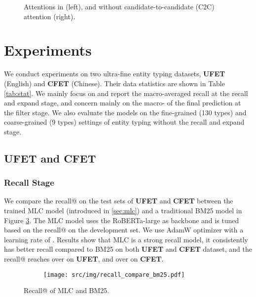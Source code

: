 \documentclass[11pt]{article}
\begin{document}
\begin{figure}[h]
    \centering
    \caption{Attentions in {\bf \textsc{\name}} (left), and {\bf \textsc{\name}}  without candidate-to-candidate (C2C) attention (right).}
    \label{fig:attn1}
\end{figure} \section{Experiments}
We conduct experiments on two ultra-fine entity typing datasets, {\bf \textsc{UFET}} (English) and {\bf \textsc{CFET}} (Chinese). Their data statistics are shown in Table \ref{tab:stat}. We mainly focus on and report the macro-averaged recall at the recall and expand stage, and concern mainly on the macro- of the final prediction at the filter stage. We also evaluate the {\bf \textsc{\name}} models on the fine-grained (130 types) and coarse-grained (9 types) settings of entity typing without the recall and expand stage.
\subsection{UFET and CFET}
\subsubsection{Recall Stage}
\label{sec:recall}
We compare the recall@ on the test sets of {\bf \textsc{UFET}} and {\bf\textsc{CFET}} between the trained MLC model (introduced in \ref{sec:mlc}) and a traditional BM25 model \cite{bm25} in Figure \ref{fig:recall}. The MLC model uses the RoBERTa-large as backbone and is tuned based on the recall@ on the development set. We use AdamW optimizer with a learning rate of . Results show that MLC is a strong recall model, it consistently has better recall compared to BM25 on both {\bf\textsc{UFET}} and {\bf\textsc{CFET}} dataset, and the recall@ reaches over  on {\bf \textsc{UFET}}, and over  on {\bf \textsc{CFET}}.

\begin{figure}[t]
     \centering
     \begin{subfigure}[h]{0.5\textwidth}
         \centering
         \texttt{[image: src/img/recall\_compare\_bm25.pdf]}
         \label{fig:mb2}
     \end{subfigure}   
 \caption{Recall@ of MLC and BM25.}
 \label{fig:recall}
\end{figure}
\end{document}
